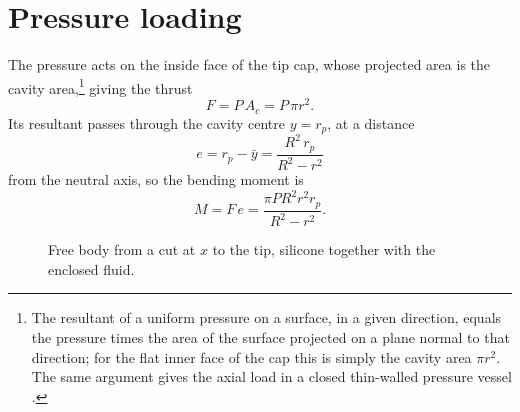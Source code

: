 \documentclass[12pt,a4paper,oneside]{report}
\numberwithin{equation}{chapter}
\numberwithin{figure}{chapter}
\numberwithin{table}{chapter}
\newcommand{\rp}{r_p}
\begin{document}
\section{Pressure loading}\label{sec:load}
The pressure acts on the inside face of the tip cap, whose projected area is the cavity
area,\footnote{The resultant of a uniform pressure on a surface, in a given direction, equals the pressure
times the area of the surface projected on a plane normal to that direction; for the flat inner face of the
cap this is simply the cavity area $\pi r^2$. The same argument gives the axial load in a closed thin-walled
pressure vessel \cite{gere2013}.} giving the thrust
\begin{equation}
F = P\,A_c = P\,\pi r^2 . \label{eq:F}
\end{equation}
Its resultant passes through the cavity centre $y=\rp$, at a distance
\begin{equation}
e = \rp - \bar y = \frac{R^2\,\rp}{R^2-r^2} \label{eq:e}
\end{equation}
from the neutral axis, so the bending moment is
\begin{equation}
M = F\,e = \frac{\pi P R^2 r^2 \rp}{R^2-r^2}. \label{eq:M}
\end{equation}

\begin{figure}[H]
\centering
{}
\caption[Free body from a cut to the tip]{Free body from a cut at $x$ to the tip, silicone together with the enclosed fluid.}
\label{fig:fbd}
\end{figure}
\end{document}
